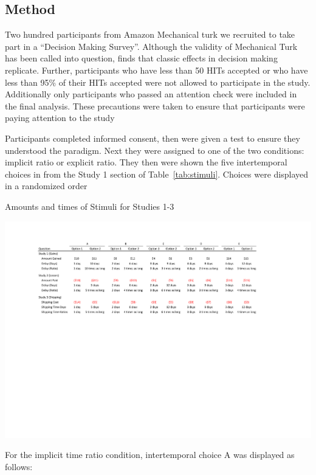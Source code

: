 \documentclass[]{article}
\begin{document}
\subsection{Method}
Two hundred participants from Amazon Mechanical turk we recruited to take part in a ``Decision Making Survey''. 
Although the validity of Mechanical Turk has been called into question,  finds that classic effects in decision making replicate. 
Further, participants who have less than 50 HITs accepted or  who have less than 95\% of their HITs accepted were not allowed to participate in the study. 
Additionally only participants who passed an attention check were included in the final analysis.
These precautions were taken to ensure that participants were paying attention to the study 

Participants completed informed consent, then were given a test to ensure they understood the paradigm.
Next they were assigned to one of the two conditions: implicit ratio or explicit ratio. 
They then were shown the five intertemporal choices in from the Study 1 section of  Table~\ref{tab:stimuli}. 
Choices were displayed in a randomized order


\begin{landscape}
\begin{table}[!ht]
	\caption{Amounts and times of Stimuli for Studies 1-3} 
	\label{tab:stimuli}
	\includegraphics[]{Stimuli_For_Study.pdf}
\end{table}
\end{landscape}

For the implicit time ratio condition, intertemporal choice A was displayed as follows: 
\end{document}

